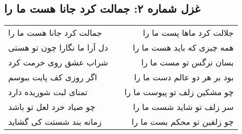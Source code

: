 \begin{center}
\section*{غزل شماره ۲: جمالت کرد جانا هست ما را}
\label{sec:002}
\begin{longtable}{l p{0.5cm} r}
جمالت کرد جانا هست ما را
&&
جلالت کرد ماها پست ما را
\\
دل آرا ما نگارا چون تو هستی
&&
همه چیزی که باید هست ما را
\\
شراب عشق روی خرمت کرد
&&
بسان نرگس تو مست ما را
\\
اگر روزی کف پایت ببوسم
&&
بود بر هر دو عالم دست ما را
\\
تمنای لبت شوریده دارد
&&
چو مشکین زلف تو پیوست ما را
\\
چو صیاد خرد لعل تو باشد
&&
سر زلف تو شاید شست ما را
\\
زمانه بند شستت کی گشاید
&&
چو زلفین تو محکم بست ما را
\\
\end{longtable}
\end{center}
